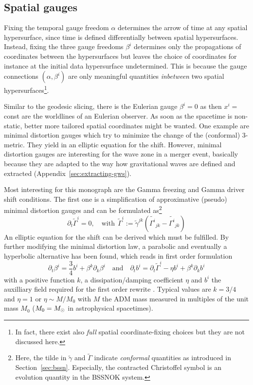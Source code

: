\subsection*{Spatial gauges}
Fixing the temporal gauge freedom $\alpha$ determines the arrow of time at any
spatial hypersurface, since time is defined differentially between spatial
hypersurfaces. Instead, fixing the three gauge freedoms $\beta^i$ determines only
the propagations of coordinates between the hypersurfaces but leaves the choice of
coordinates for instance at the initial data hypersurface undetermined. This is because
the gauge connections $(\alpha, \beta^i)$ are only meaningful
quantities \emph{inbetween} two spatial hypersurfaces\footnote{
	In fact, there exist also \emph{full} spatial coordinate-fixing choices but they
	are not discussed here.
}.

Similar to the geodesic slicing, there is the Eulerian gauge $\beta^i=0$ as then
$x^i=$const are the worldlines of an Eulerian observer. As soon as the spacetime
is non-static, better more tailored spatial coordinates might be wanted. One
example are minimal distortion gauges which try to minimize the change of the
(conformal) 3-metric.
They yield in an elliptic equation for the shift. However,
minimal distortion gauges are interesting for the wave zone in a merger event,
basically because they are adapted to the way how gravitational waves are defined
and extracted (Appendix~\ref{sec:extracting-gws}).

Most interesting for this monograph are the Gamma freezing and Gamma driver
shift conditions. The first one is a simplification of approximative (pseudo)
minimal distortion gauges and can be formulated as\footnote{
	Here, the tilde in $\tilde{\gamma}$ and $\tilde{\Gamma}$ indicate 
	\emph{conformal} quantities as introduced in Section~\vref{sec:bssn}.
	Especially, the contracted Christoffel symbol is an evolution quantity
	in the BSSNOK system.
}
\begin{equation}
\partial_t \tilde{\Gamma}^i = 0, \quad\text{with}~~
\tilde{\Gamma}^i := \tilde{\gamma}^{jk} \left(\tilde{\Gamma^i}_{jk} - \tilde{\Gamma^i}_{jk} \right)
\end{equation}
An elliptic equation for the shift can be derived which must be fulfilled. By
further modifying the minimal distortion law, a parabolic \cite{Alcubierre00a}
and eventually a hyperbolic \cite{Alcubierre02a,Lindblom:2003ad,Bona05a}
alternative has been found, which reads in first order 
formulation
\begin{equation}\label{eq:gamma-driver}
	\partial_t \beta^i = \frac 34 b^i + \beta^k \partial_k \beta^i
	\quad\text{and}\quad
	\partial_t b^i = \partial_t \tilde\Gamma^i - \eta b^i + \beta^k \partial_k 
	b^i
\end{equation}
with a positive function $k$, a dissipation/damping coefficient $\eta$ and $b^i$ the
auxilliary field required for the first order rewrite
\cite{Baker:2006mp,Brugmann:2008zz}. Typical values are $k=3/4$ and
$\eta=1$ or $\eta\sim M/M_0$ with $M$ the ADM mass measured in multiples of the
unit mass $M_0$ (\ie $M_0=M_{\odot}$ in astrophysical spacetimes).

